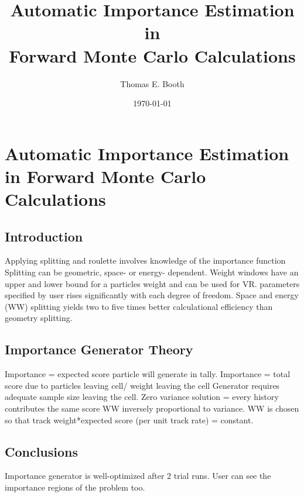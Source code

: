 \documentclass{report}
\begin{document}
\title{Automatic Importance Estimation in  \\
         Forward Monte Carlo Calculations}
\author{Thomas E. Booth}
\date{\today}
\setcounter{secnumdepth}{0}
\section{Automatic Importance Estimation in Forward Monte Carlo Calculations}
\subsection{Introduction}
\begin{outline}
 \1 Applying splitting and roulette involves knowledge of the importance function
 \1 Splitting can be geometric, space- or energy- dependent. 
 \1 Weight windows have an upper and lower bound for a particles weight and can be used for VR. 
 \1 parameters specified by user rises significantly with each degree of freedom. 
 \1 Space and energy (WW) splitting yields two to five times better calculational efficiency than geometry splitting. 
\end{outline}
\subsection{Importance Generator Theory}
\begin{outline}
 \1 Importance = expected score particle will generate in tally. 
 \1 Importance = total score due to particles leaving cell/ weight leaving the cell
 \1 Generator requires adequate sample size leaving the cell. 
 \1 Zero variance solution = every history contributes the same score
 \1 WW inversely proportional to variance.
   \2 WW is chosen so that track weight*expected score (per unit track rate) = constant. 
\end{outline}
\subsection{Conclusions}
\begin{outline}
 \1 Importance generator is well-optimized after 2 trial runs. 
 \1 User can see the importance regions of the problem too. 
\end{outline}
\end{document}
